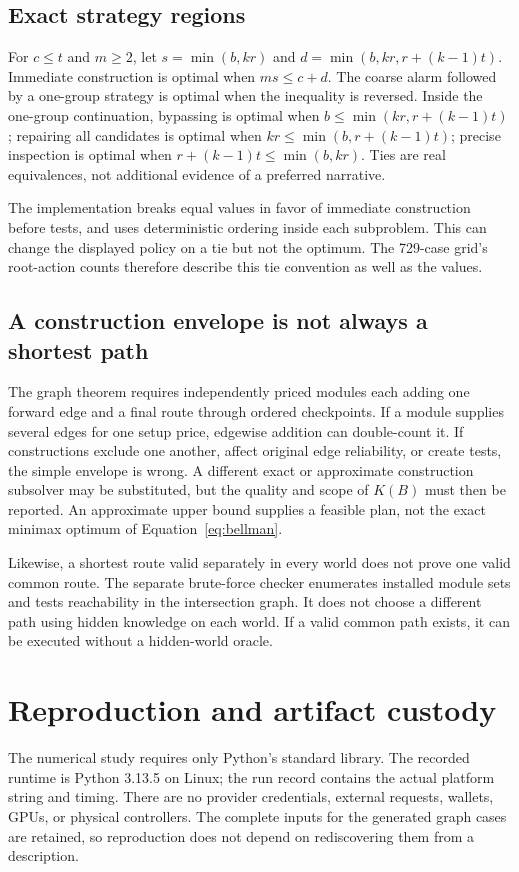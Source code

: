 \documentclass[11pt,letterpaper]{article}
\theoremstyle{remark}\newtheorem{remark}{Remark}[section]
\begin{document}
\subsection{Exact strategy regions}
For $c\le t$ and $m\ge2$, let $s=\min(b,kr)$ and $d=\min(b,kr,r+(k-1)t)$. Immediate construction is optimal when $ms\le c+d$. The coarse alarm followed by a one-group strategy is optimal when the inequality is reversed. Inside the one-group continuation, bypassing is optimal when $b\le\min(kr,r+(k-1)t)$; repairing all candidates is optimal when $kr\le\min(b,r+(k-1)t)$; precise inspection is optimal when $r+(k-1)t\le\min(b,kr)$. Ties are real equivalences, not additional evidence of a preferred narrative.

The implementation breaks equal values in favor of immediate construction before tests, and uses deterministic ordering inside each subproblem. This can change the displayed policy on a tie but not the optimum. The 729-case grid's root-action counts therefore describe this tie convention as well as the values.

\subsection{A construction envelope is not always a shortest path}
The graph theorem requires independently priced modules each adding one forward edge and a final route through ordered checkpoints. If a module supplies several edges for one setup price, edgewise addition can double-count it. If constructions exclude one another, affect original edge reliability, or create tests, the simple envelope is wrong. A different exact or approximate construction subsolver may be substituted, but the quality and scope of $K(B)$ must then be reported. An approximate upper bound supplies a feasible plan, not the exact minimax optimum of Equation~\eqref{eq:bellman}.

Likewise, a shortest route valid separately in every world does not prove one valid common route. The separate brute-force checker enumerates installed module sets and tests reachability in the intersection graph. It does not choose a different path using hidden knowledge on each world. If a valid common path exists, it can be executed without a hidden-world oracle.

\section{Reproduction and artifact custody}
\label{app:reproduce}
The numerical study requires only Python's standard library. The recorded runtime is Python 3.13.5 on Linux; the run record contains the actual platform string and timing. There are no provider credentials, external requests, wallets, GPUs, or physical controllers. The complete inputs for the generated graph cases are retained, so reproduction does not depend on rediscovering them from a description.
\end{document}
